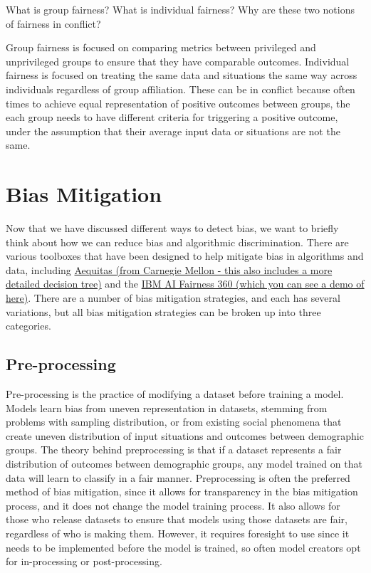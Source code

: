 \documentclass[assignment03_Solutions]{subfiles}
\begin{document}
\begin{understandingcheck}
What is group fairness? What is individual fairness? Why are these two notions of fairness in conflict?
\begin{boxedsolution}
Group fairness is focused on comparing metrics between privileged and unprivileged groups to ensure that they have comparable outcomes. Individual fairness is focused on treating the same data and situations the same way across individuals regardless of group affiliation. These can be in conflict because often times to achieve equal representation of positive outcomes between groups, the each group needs to have different criteria for triggering a positive outcome, under the assumption that their average input data or situations are not the same.
\end{boxedsolution}

\end{understandingcheck}
\section*{Bias Mitigation}

Now that we have discussed different ways to detect bias, we want to briefly think about how we can reduce bias and algorithmic discrimination. There are various toolboxes that have been designed to help mitigate bias in algorithms and data, including \href{http://www.datasciencepublicpolicy.org/our-work/tools-guides/aequitas/}{Aequitas (from Carnegie Mellon - this also includes a more detailed decision tree)} and the \href{http://aif360.mybluemix.net/data}{IBM AI Fairness 360 (which you can see a demo of here)}. There are a number of bias mitigation strategies, and each has several variations, but all bias mitigation strategies can be broken up into three categories.
 \subsection*{Pre-processing}
 Pre-processing is the practice of modifying a dataset before training a model. Models learn bias from uneven representation in datasets, stemming from problems with sampling distribution, or from existing social phenomena that create uneven distribution of input situations and outcomes between demographic groups. The theory behind preprocessing is that if a dataset represents a fair distribution of outcomes between demographic groups, any model trained on that data will learn to classify in a fair manner. Preprocessing is often the preferred method of bias mitigation, since it allows for transparency in the bias mitigation process, and it does not change the model training process. It also allows for those who release datasets to ensure that models using those datasets are fair, regardless of who is making them. However, it requires foresight to use since it needs to be implemented before the model is trained, so often model creators opt for in-processing or post-processing.
\end{document}
